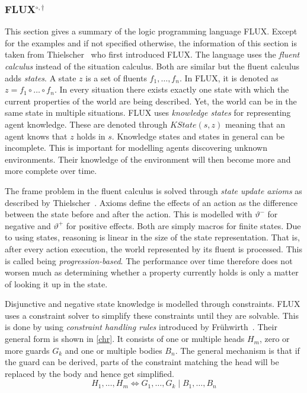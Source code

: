 \subsubsection[FLUX]{FLUX$^{\circ,\dagger}$}\label{fun:apl_flux}
This section gives a summary of the logic programming language FLUX.
Except for the examples and if not specified otherwise, the information of this section is taken from Thielscher~\cite{thielscher_flux:_2005} who first introduced FLUX.
The language uses the \emph{fluent calculus} instead of the situation calculus.
Both are similar but the fluent calculus adds \emph{states}.
A state $z$ is a set of fluents $f_1,\dotsc,f_n$.
In FLUX, it is denoted as $z = f_1 \circ\dotsc\circ f_n$.
In every situation there exists exactly one state with which the current properties of the world are being described.
Yet, the world can be in the same state in multiple situations.
FLUX uses \emph{knowledge states} for representing agent knowledge.
These are denoted through $\textit{KState}(s,z)$ meaning that an agent knows that $z$ holds in $s$.
Knowledge states and states in general can be incomplete.
This is important for modelling agents discovering unknown environments.
Their knowledge of the environment will then become more and more complete over time.

The frame problem in the fluent calculus is solved through \emph{state update axioms} as described by Thielscher~\cite{thielscher_situation_1999}.
Axioms define the effects of an action as the difference between the state before and after the action.
This is modelled with $\vartheta^-$ for negative and $\vartheta^+$ for positive effects.
Both are simply macros for finite states.
Due to using states, reasoning is linear in the size of the state representation.
That is, after every action execution, the world represented by its fluent is processed.
This is called being \emph{progression-based}.
The performance over time therefore does not worsen much as determining whether a property currently holds is only a matter of looking it up in the state.

Disjunctive and negative state knowledge is modelled through constraints.
FLUX uses a constraint solver to simplify these constraints until they are solvable.
This is done by using \emph{constraint handling rules} introduced by Frühwirth~\cite{fruhwirth_theory_1998}.
Their general form is shown in \autoref{chr}.
It consists of one or multiple heads $H_m$, zero or more guards $G_k$ and one or multiple bodies $B_n$.
The general mechanism is that if the guard can be derived, parts of the constraint matching the head will be replaced by the body and hence get simplified.
\begin{equation}\label{chr}
  H_1,\ldots,H_m\Leftrightarrow G_1,\ldots,G_k \mid B_1,\ldots,B_n
\end{equation}

